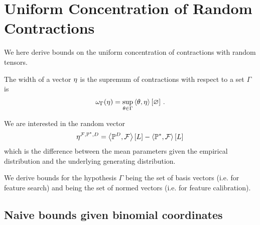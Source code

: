 \section{Uniform Concentration of Random Contractions}\label{cha:widthBounds}

We here derive bounds on the uniform concentration of contractions with random tensors.




	
	
	

The width of a vector $\eta$ is the supremum of contractions with respect to a set $\Gamma$ is
\begin{align}
	\omega_{\Gamma}(\eta)
	= \sup_{\theta\in\Gamma} \left\langle \theta,\eta\right\rangle \left[ \varnothing \right] \, . 
\end{align}

We are interested in the random vector
	\[ \eta^{\mathcal{F},\mathbb{P}^*,D} = \left\langle \mathbb{P}^{D},\mathcal{F}\right\rangle \left[ L \right] -  \left\langle \mathbb{P}^*,\mathcal{F}\right\rangle \left[ L \right]  \,  \]
which is the difference between the mean parameters given the empirical distribution and the underlying generating distribution.

We derive bounds for the hypothesis $\Gamma$ being the set of basis vectors (i.e. for feature search) and being the set of normed vectors (i.e. for feature calibration).










\subsection{Naive bounds given binomial coordinates}


